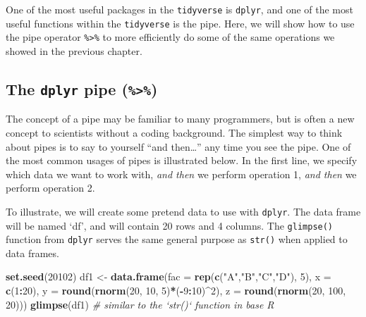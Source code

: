 \documentclass[letterpaper,]{book}
\newenvironment{Shaded}{\begin{snugshade}}{\end{snugshade}}
\newcommand{\CommentTok}[1]{\textcolor[rgb]{0.56,0.35,0.01}{\textit{#1}}}
\newcommand{\DataTypeTok}[1]{\textcolor[rgb]{0.13,0.29,0.53}{#1}}
\newcommand{\DecValTok}[1]{\textcolor[rgb]{0.00,0.00,0.81}{#1}}
\newcommand{\KeywordTok}[1]{\textcolor[rgb]{0.13,0.29,0.53}{\textbf{#1}}}
\newcommand{\NormalTok}[1]{#1}
\newcommand{\OperatorTok}[1]{\textcolor[rgb]{0.81,0.36,0.00}{\textbf{#1}}}
\newcommand{\StringTok}[1]{\textcolor[rgb]{0.31,0.60,0.02}{#1}}
\begin{document}
One of the most useful packages in the \texttt{tidyverse} is \texttt{dplyr}, and one of the most useful functions within the \texttt{tidyverse} is the pipe. Here, we will show how to use the pipe operator \texttt{\%\textgreater{}\%} to more efficiently do some of the same operations we showed in the previous chapter.

\hypertarget{the-dplyr-pipe}{%
\subsection{\texorpdfstring{The \texttt{dplyr} pipe (\texttt{\%\textgreater{}\%})}{The dplyr pipe (\%\textgreater{}\%)}}\label{the-dplyr-pipe}}

The concept of a pipe may be familiar to many programmers, but is often a new concept to scientists without a coding background. The simplest way to think about pipes is to say to yourself ``and then\ldots{}'' any time you see the pipe. One of the most common usages of pipes is illustrated below. In the first line, we specify which data we want to work with, \emph{and then} we perform operation 1, \emph{and then} we perform operation 2.

\begin{Shaded}
\end{Shaded}

To illustrate, we will create some pretend data to use with \texttt{dplyr}. The data frame will be named `df', and will contain 20 rows and 4 columns. The \texttt{glimpse()} function from \texttt{dplyr} serves the same general purpose as \texttt{str()} when applied to data frames.

\begin{Shaded}
\begin{Highlighting}[]
\KeywordTok{set.seed}\NormalTok{(}\DecValTok{20102}\NormalTok{)}
\NormalTok{df1 <-}\StringTok{ }\KeywordTok{data.frame}\NormalTok{(}\DataTypeTok{fac =} \KeywordTok{rep}\NormalTok{(}\KeywordTok{c}\NormalTok{(}\StringTok{"A"}\NormalTok{,}\StringTok{"B"}\NormalTok{,}\StringTok{"C"}\NormalTok{,}\StringTok{"D"}\NormalTok{), }\DecValTok{5}\NormalTok{),}
                 \DataTypeTok{x =} \KeywordTok{c}\NormalTok{(}\DecValTok{1}\OperatorTok{:}\DecValTok{20}\NormalTok{),}
                 \DataTypeTok{y =} \KeywordTok{round}\NormalTok{(}\KeywordTok{rnorm}\NormalTok{(}\DecValTok{20}\NormalTok{, }\DecValTok{10}\NormalTok{, }\DecValTok{5}\NormalTok{)}\OperatorTok{*}\NormalTok{(}\OperatorTok{-}\DecValTok{9}\OperatorTok{:}\DecValTok{10}\NormalTok{)}\OperatorTok{^}\DecValTok{2}\NormalTok{),}
                 \DataTypeTok{z =} \KeywordTok{round}\NormalTok{(}\KeywordTok{rnorm}\NormalTok{(}\DecValTok{20}\NormalTok{, }\DecValTok{100}\NormalTok{, }\DecValTok{20}\NormalTok{)))}
\KeywordTok{glimpse}\NormalTok{(df1) }\CommentTok{# similar to the `str()` function in base R}
\end{Highlighting}
\end{Shaded}
\end{document}
